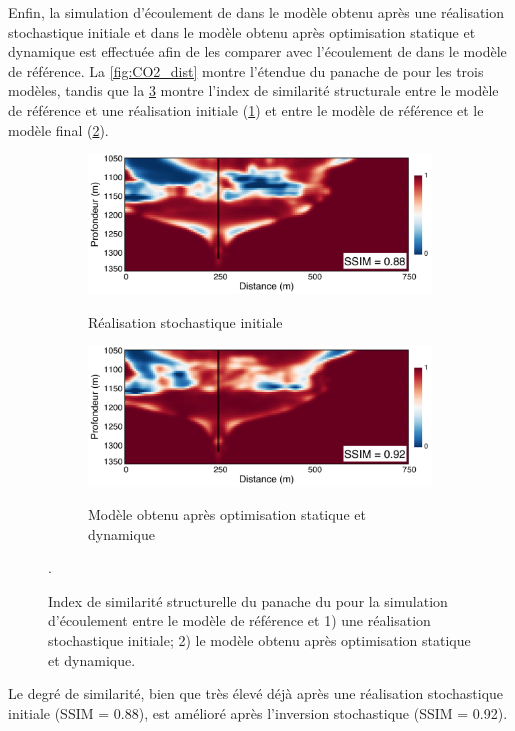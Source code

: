 Enfin, la simulation d’écoulement de  dans le modèle obtenu après une
réalisation stochastique initiale et dans le modèle obtenu après optimisation statique et dynamique 
est effectuée afin de les comparer avec l'écoulement de  dans le modèle
de référence. La \cref{fig:CO2_dist} montre l'étendue du panache de 
pour les trois modèles, tandis que la \cref{fig:SSIM_intro} montre l'index de
similarité structurale entre le modèle de référence et une réalisation initiale
(\cref{fig:SSIM_real}) et entre le modèle de référence et le modèle final
(\cref{fig:SSIM_dg}).
\begin{figure}[!ht]
        \centering
        \begin{subfigure}[b]{0.7\textwidth}
                \caption{Réalisation stochastique initiale}
                \includegraphics[width=\textwidth]{fig/SSIM_real.pdf}
                \label{fig:SSIM_real}
        \end{subfigure}%

        \begin{subfigure}[b]{0.7\textwidth}
                \caption{Modèle obtenu après optimisation statique et dynamique}
                \includegraphics[width=\textwidth]{fig/SSIM_dg.pdf}
                \label{fig:SSIM_dg}
        \end{subfigure}
        \caption{Index de similarité structurelle \citep{Wang2004} du panache du
 pour la simulation d’écoulement entre le modèle de référence et 1) une
réalisation stochastique initiale; 2) le modèle obtenu après optimisation
statique et dynamique.}
        \label{fig:SSIM_intro}.
\end{figure}
Le degré de similarité, bien que très élevé déjà après une réalisation
stochastique initiale (SSIM = \num{0.88}), est amélioré après l'inversion
stochastique (SSIM = \num{0.92}).
